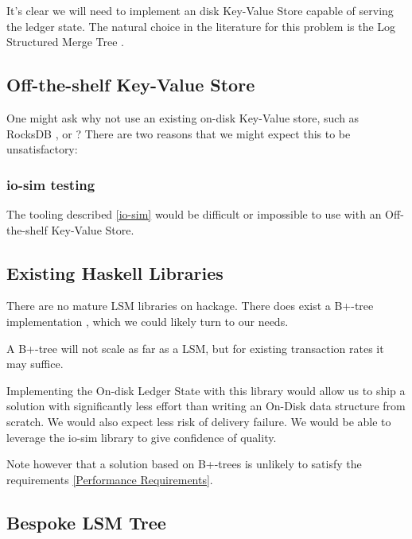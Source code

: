 \documentclass[11pt,a4paper]{article}
\begin{document}
It's clear we will need to implement an disk Key-Value Store capable of serving
the ledger state. The natural choice in the literature for this problem is the Log Structured Merge Tree . 

\subsection{Off-the-shelf Key-Value Store}


One might ask why not use an existing on-disk Key-Value store, such as
RocksDB , or ? There are two
reasons that we might expect this to be unsatisfactory:

\subsubsection{io-sim testing}
The tooling described \ref{io-sim} would be difficult or impossible to use with
an Off-the-shelf Key-Value Store.

\subsection{Existing Haskell Libraries}

There are no mature LSM libraries on hackage. There does exist a B+-tree
implementation ,
which we could likely turn to our needs.

A B+-tree will not scale as far as a LSM, but for existing transaction rates it
may suffice.

Implementing the On-disk Ledger State with this library would allow us to ship a
solution with significantly less effort than writing an On-Disk data structure
from scratch. We would also expect less risk of delivery failure. We would be
able to leverage the io-sim library to give confidence of quality.

Note however that a solution based on B+-trees is unlikely to satisfy the
requirements \ref{Performance Requirements}.

\subsection{Bespoke LSM Tree}
\end{document}
